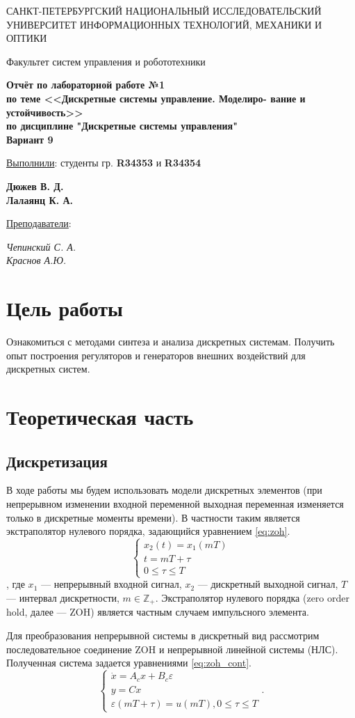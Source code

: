 \documentclass[a4paper, 14pt]{extarticle}
\theoremstyle{definition}
\theoremstyle{plain}
\theoremstyle{remark}
\newcommand*{\titlePage}{
	\thispagestyle{title}
	\begingroup
	\begin{center}
		\vspace*{3ex}
		{\small
			САНКТ-ПЕТЕРБУРГСКИЙ НАЦИОНАЛЬНЫЙ ИССЛЕДОВАТЕЛЬСКИЙ УНИВЕРСИТЕТ ИНФОРМАЦИОННЫХ ТЕХНОЛОГИЙ, МЕХАНИКИ И ОПТИКИ	
		}
		
		\vspace*{2ex}
		
		{\normalsize
			Факультет систем управления и робототехники
		}
		
		\vspace*{15ex}
		
		{\Large \bfseries 
			Отчёт по лабораторной работе №1\\
			{\large по теме <<Дискретные системы управление. Моделиро-
			вание и устойчивость>>\\
				по дисциплине "Дискретные системы управления"\\
				\vspace{2em}
				Вариант 9}
			
		}
		
	\end{center}
	\vspace*{10ex}
	\begin{flushright}
		{\large 
			\underline{Выполнили}: студенты гр. \textbf{R34353} и \textbf{R34354} \\
			\begin{flushright}
				\textbf{Дюжев В. Д.}\\
				\textbf{Лалаянц К. А.}\\
			\end{flushright}
		}
		\vspace*{5ex}
		{\large 
			\underline{Преподаватели}:\\ 
			\begin{flushright}
            \textit{Чепинский С. А.\\Краснов А.Ю.}
			\end{flushright}
		}
	\end{flushright}	
	\newpage
	\setcounter{page}{1}
	\endgroup}
\begin{document}
\renewcommand{\contentsname}{\hfillОГЛАВЛЕНИЕ\hfill} 
\titlePage
\thispagestyle{plain}
\tableofcontents
\pagestyle{style}

\newpage
\setcounter{page}{1}

% 

\section{Цель работы}
Ознакомиться с методами синтеза и анализа дискретных системам. Получить опыт построения регуляторов и генераторов внешних воздействий для дискретных систем.

\section{Теоретическая часть}
\subsection{Дискретизация}
В ходе работы мы будем использовать модели дискретных элементов (при непрерывном изменении входной переменной выходная переменная изменяется только в
дискретные моменты времени). В частности таким является экстраполятор нулевого порядка, задающийся уравнением \ref{eq:zoh}.
\begin{equation}\label{eq:zoh}
	\begin{cases}
		x_2(t) = x_1(mT) \\
		t = mT + \tau \\ 0\le\tau\le T
	\end{cases}
\end{equation}
, где $x_1$ --- непрерывный входной сигнал, $x_2$ --- дискретный выходной сигнал, $T$ --- интервал дискретности, $m \in \mathbb{Z}_+$. Экстраполятор нулевого порядка (zero order hold, далее --- ZOH) является частным случаем импульсного элемента.

Для преобразования непрерывной системы в дискретный вид рассмотрим последовательное соединение ZOH и непрерывной линейной системы (НЛС). Полученная система задается уравнениями \ref{eq:zoh_cont}.
\begin{equation}\label{eq:zoh_cont}
	\begin{cases}
		\dot{x} = A_cx + B_c\varepsilon \\
		y = Cx \\
		\varepsilon(mT + \tau) = u(mT), 0\le\tau\le T
	\end{cases}.
\end{equation}
\end{document}
